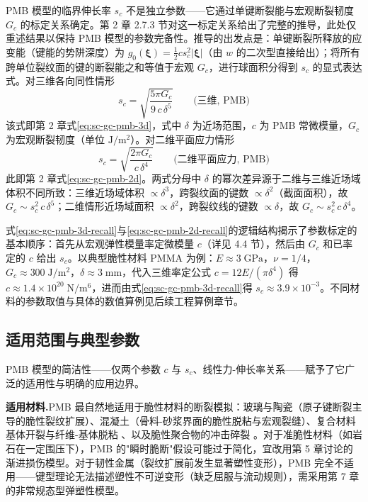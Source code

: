 PMB 模型的临界伸长率 $s_c$ 不是独立参数——它通过单键断裂能与宏观断裂韧度 $G_c$ 的标定关系确定。第 2 章 2.7.3 节对这一标定关系给出了完整的推导，此处仅重述结果以保持 PMB 模型的参数完备性。推导的出发点是：单键断裂所释放的应变能（键能的势阱深度）为 $g_0(\boldsymbol{\xi})=\tfrac{1}{2}c s_c^{2}|\boldsymbol{\xi}|$（由 $w$ 的二次型直接给出）；将所有跨单位裂纹面的键的断裂能之和等值于宏观 $G_c$，进行球面积分得到 $s_c$ 的显式表达式。对三维各向同性情形
\begin{equation}
s_c = \sqrt{\frac{5\pi G_c}{9\,c\,\delta^{5}}} \qquad \text{(三维, PMB)}
\label{eq:sc-gc-pmb-3d-recall}
\end{equation}
该式即第 2 章式\eqref{eq:sc-gc-pmb-3d}，式中 $\delta$ 为近场范围，$c$ 为 PMB 常微模量，$G_c$ 为宏观断裂韧度（单位 $\mathrm{J}/\mathrm{m}^{2}$）。对二维平面应力情形
\begin{equation}
s_c = \sqrt{\frac{2\pi G_c}{c\,\delta^{4}}} \qquad \text{(二维平面应力, PMB)}
\label{eq:sc-gc-pmb-2d-recall}
\end{equation}
此即第 2 章式\eqref{eq:sc-gc-pmb-2d}。两式分母中 $\delta$ 的幂次差异源于二维与三维近场域体积不同所致：三维近场域体积 $\propto\delta^{3}$，跨裂纹面的键数 $\propto\delta^{2}$（截面面积），故 $G_c\sim s_c^{2}\,c\,\delta^{5}$；二维情形近场域面积 $\propto\delta^{2}$，跨裂纹线的键数 $\propto\delta$，故 $G_c\sim s_c^{2}\,c\,\delta^{4}$。

式\eqref{eq:sc-gc-pmb-3d-recall}与\eqref{eq:sc-gc-pmb-2d-recall}的逻辑结构揭示了参数标定的基本顺序：首先从宏观弹性模量率定微模量 $c$（详见 4.4 节），然后由 $G_c$ 和已率定的 $c$ 给出 $s_c$。以典型脆性材料 PMMA 为例：$E\approx 3\;\mathrm{GPa}$，$\nu=1/4$，$G_c\approx 300\;\mathrm{J}/\mathrm{m}^{2}$，$\delta\approx 3\;\mathrm{mm}$，代入三维率定公式 $c=12E/(\pi\delta^{4})$ 得 $c\approx 1.4\times 10^{20}\;\mathrm{N}/\mathrm{m}^{6}$，进而由式\eqref{eq:sc-gc-pmb-3d-recall}得 $s_c\approx 3.9\times 10^{-3}$。不同材料的参数取值与具体的数值算例见后续工程算例章节。

\subsection{适用范围与典型参数}

PMB 模型的简洁性——仅两个参数 $c$ 与 $s_c$、线性力-伸长率关系——赋予了它广泛的适用性与明确的应用边界。

\textbf{适用材料.}PMB 最自然地适用于脆性材料的断裂模拟：玻璃与陶瓷（原子键断裂主导的脆性裂纹扩展）、混凝土（骨料-砂浆界面的脆性脱粘与宏观裂缝）、复合材料基体开裂与纤维-基体脱粘 \cite{HaBobaru2010}、以及脆性聚合物的冲击碎裂 \cite{Bobaru2016}。对于准脆性材料（如岩石在一定围压下），PMB 的"瞬时脆断"假设可能过于简化，宜改用第 5 章讨论的渐进损伤模型。对于韧性金属（裂纹扩展前发生显著塑性变形），PMB 完全不适用——键型理论无法描述塑性不可逆变形（缺乏屈服与流动规则），需采用第 7 章的非常规态型弹塑性模型。

